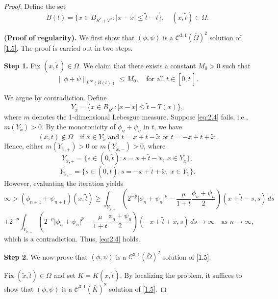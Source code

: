 \documentclass[10pt,a4paper]{amsart}
\begin{document}
\begin{proof}
  Define the set
  $$
    B(t) = \bigl\{ x \in B_{R^*+T^*}: \lvert x - \tilde{x} \rvert \le \tilde{t}-t \bigr\}, \quad (\tilde{x}, \tilde{t}) \in \Omega.
  $$

  \medskip
  \noindent\textbf{(Proof of regularity).}  
  We first show that \((\phi, \psi)\) is a \(\mathcal{C}^{3,1}(\overline{\Omega})^2\) solution of \eqref{1.5}.  
  The proof is carried out in two steps.

  \smallskip
  \noindent\textbf{Step 1.}  
  Fix \((x, \tilde{t}\,) \in \Omega\).  
  We claim that there exists a constant \(M_0 > 0\) such that
  \begin{equation}
    \label{eq:2.4}
    \lVert \phi + \psi \rVert_{L^\infty(B(t))} \le M_0, \quad \text{for all } t \in [0, \tilde{t}\,].
  \end{equation}

  \noindent We argue by contradiction. Define  
  $$
    Y_{\tilde{x}} = \{ x \in B_{R^*} : \lvert x - \tilde{x} \rvert \le \tilde{t} - T(x) \},
  $$
  where \(m\) denotes the 1-dimensional Lebesgue measure.  
  Suppose \eqref{eq:2.4} fails, i.e., \(m(Y_{\tilde{x}}) > 0\).  
  By the monotonicity of \(\phi_n + \psi_n\) in \(t\), we have  
  $$
    (x, t) \notin \Omega \quad \text{if } x \in Y_{\tilde{x}} \text{ and } t = x + \tilde{t} - \tilde{x} \text{ or } t = -x + \tilde{t} + \tilde{x}.
  $$
  Hence, either \(m(Y_{\tilde{x},+}) > 0\) or \(m(Y_{\tilde{x},-}) > 0\), where  
  $$
    Y_{\tilde{x},+} = \{ s \in (0, \tilde{t}) : s = x + \tilde{t} - \tilde{x}, \ x \in Y_{\tilde{x}} \},  
  $$
  $$
    Y_{\tilde{x},-} = \{ s \in (0, \tilde{t}) : s = -x + \tilde{t} + \tilde{x}, \ x \in Y_{\tilde{x}} \}.
  $$
  However, evaluating the iteration yields  
  $$
    \infty > (\phi_{n+1} + \psi_{n+1})(\tilde{x}, \tilde{t}) 
    \geq \int_{Y_{\tilde{x},+}} \left( 2^{-p} \lvert \phi_n + \psi_n \rvert^p - \frac{\mu}{1+t} \frac{\phi_n + \psi_n}{2} \right)(x + \tilde{t} - s, s) \, ds  
  $$
  $$
    + 2^{-p} \int_{Y_{\tilde{x},-}} \left( 2^{-p} \lvert \phi_n + \psi_n \rvert^p - \frac{\mu}{1+t} \frac{\phi_n + \psi_n}{2} \right)(-x + \tilde{t} + \tilde{x}, s) \, ds \to \infty \quad \text{as } n \to \infty,
  $$
  which is a contradiction. Thus, \eqref{eq:2.4} holds.

   \noindent\textbf{Step 2.} 
We now prove that $(\phi, \psi)$ is a $\mathcal{C}^{3,1}(\overline{\Omega})^2$ solution of \eqref{1.5}.  

Fix $(\tilde{x}, \tilde{t}) \in \Omega$ and set $K = K(x, \tilde{t})$.  
By localizing the problem, it suffices to show that $(\phi, \psi)$ is a $\mathcal{C}^{3,1}(\overline{K})^2$ solution of \eqref{1.5}.  


\end{proof}
\end{document}
